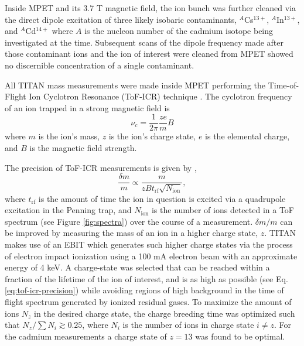 \documentclass[twocolumn,prc,showpacs,preprintnumbers,amsmath,amssymb,superscriptaddress,nofootinbib,aps,10pt]{revtex4-1}
\begin{document}
Inside MPET and its 3.7 T magnetic field, the ion bunch was further cleaned via the direct dipole excitation \cite{Blaum2007} of three likely isobaric contaminants, $^{A}$Cs$^{13+}$,  $^{A}$In$^{13+}$, and $^{A}$Cd$^{14+}$ where $A$ is the nucleon number of the cadmium isotope being investigated at the time. Subsequent scans of the dipole frequency made after those contaminant ions and the ion of interest were cleaned from MPET showed no discernible concentration of a single contaminant.

All TITAN mass measurements were made inside MPET performing the Time-of-Flight Ion Cyclotron Resonance (ToF-ICR) technique \cite{Bollen1990b}. The cyclotron frequency of an ion trapped in a strong magnetic field is
\begin{equation}
\nu_c = \frac{1}{2\pi}\frac{ze}{m}B
\end{equation}
where $m$ is the ion's mass, $z$ is the ion's charge state, $e$ is the elemental charge, and $B$ is the magnetic field strength.

The precision of ToF-ICR measurements is given by \cite{Bollen2001},
\begin{equation}
\label{eq:tof-icr-precision}
\frac{\delta m}{m} \propto \frac{m}{zBt_{\mathrm{rf}}\sqrt{N_{\mathrm{ion}}}},
\end{equation}
where $t_{\mathrm{rf}}$ is the amount of time the ion in question is excited via a quadrupole excitation in the Penning trap, and $N_{\mathrm{ion}}$ is the number of ions detected in a ToF spectrum (see Figure \ref{fig:spectra}) over the course of a measurement. $\delta m/m$ can be improved by measuring the mass of an ion in a higher charge state, $z$. TITAN makes use of an EBIT which generates such higher charge states via the process of electron impact ionization using a 100 mA electron beam with an approximate energy of 4 keV. A charge-state was selected that can be reached within a fraction of the lifetime of the ion of interest, and is as high as possible (see Eq. \ref{eq:tof-icr-precision}) while avoiding regions of high background in the time of flight spectrum generated by ionized residual gases. To maximize the amount of ions $N_z$ in the desired charge state, the charge breeding time was optimized such that $N_z/\sum N_i \gtrsim 0.25$, where $N_i$ is the number of ions in charge state $i\neq z$. For the cadmium measurements a charge state of $z=13$ was found to be optimal.
\end{document}
